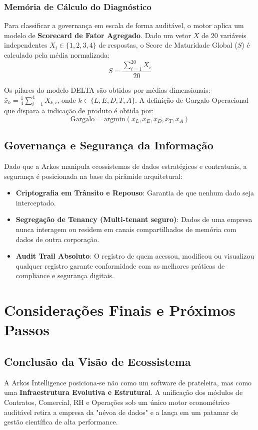 \subsection{Memória de Cálculo do Diagnóstico}
Para classificar a governança em escala de forma auditável, o motor aplica um modelo de \textbf{Scorecard de Fator Agregado}. Dado um vetor $X$ de $20$ variáveis independentes $X_i \in \{1,2,3,4\}$ de respostas, o Score de Maturidade Global ($S$) é calculado pela média normalizada:
\begin{equation}
S = \frac{\sum_{i=1}^{20} X_i}{20}
\end{equation}

Os pilares do modelo DELTA são obtidos por médias dimensionais: $\bar{x}_k = \frac{1}{4} \sum_{i=1}^{4} X_{k,i}$, onde $k \in \{L, E, D, T, A\}$. A deﬁnição de Gargalo Operacional que dispara a indicação de produto é obtida por:
\begin{equation}
\text{Gargalo} = \text{argmin} (\bar{x}_L, \bar{x}_E, \bar{x}_D, \bar{x}_T, \bar{x}_A)
\end{equation}
\vspace{0.5cm}

\section{Governança e Segurança da Informação}
Dado que a Arkos manipula ecossistemas de dados estratégicos e contratuais, a segurança é posicionada na base da pirâmide arquitetural:
\begin{itemize}
    \item \textbf{Criptografia em Trânsito e Repouso}: Garantia de que nenhum dado seja interceptado.
    \item \textbf{Segregação de Tenancy (Multi-tenant seguro)}: Dados de uma empresa nunca interagem ou residem em canais compartilhados de memória com dados de outra corporação.
    \item \textbf{Audit Trail Absoluto}: O registro de quem acessou, modificou ou visualizou qualquer registro garante conformidade com as melhores práticas de compliance e segurança digitais.
\end{itemize}

\pagebreak
\chapter{Considerações Finais e Próximos Passos}

\section{Conclusão da Visão de Ecossistema}
A Arkos Intelligence posiciona-se não como um software de prateleira, mas como uma \textbf{Infraestrutura Evolutiva e Estrutural}. A unificação dos módulos de Contratos, Comercial, RH e Operações sob um único motor econométrico auditável retira a empresa da "névoa de dados" e a lança em um patamar de gestão científica de alta performance.

